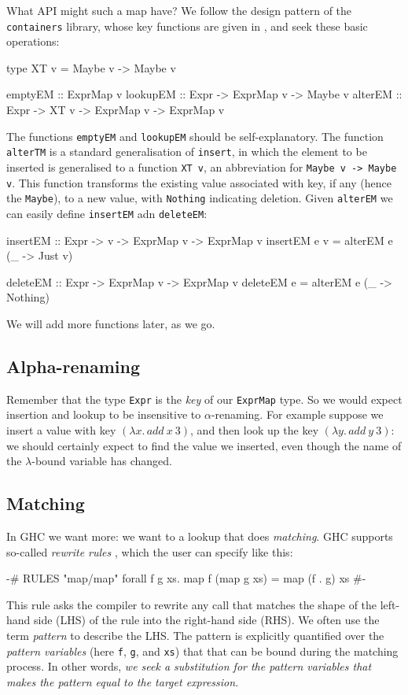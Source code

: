 \documentclass[acmsmall]{acmart}
\theoremstyle{theorem}
\theoremstyle{definition}
\theoremstyle{remark}
\begin{document}
What API might such a map have? We follow the design pattern of
the \lstinline{containers} library, whose key functions are given in ,
and seek these basic operations:
\begin{code}
  type XT v = Maybe v -> Maybe v

  emptyEM  :: ExprMap v
  lookupEM :: Expr -> ExprMap v -> Maybe v
  alterEM  :: Expr -> XT v -> ExprMap v -> ExprMap v
\end{code}
The functions \lstinline{emptyEM} and \lstinline{lookupEM} should be
self-explanatory.  The function \lstinline{alterTM} is a standard
generalisation of \lstinline{insert}, in which the element to be
inserted is generalised to a function \lstinline{XT v}, an
abbreviation for \lstinline{Maybe v -> Maybe v}.  This function
transforms the existing value associated with key, if any (hence the
\lstinline{Maybe}), to a new value, with \lstinline{Nothing}
indicating deletion.  Given \lstinline{alterEM} we can easily define \lstinline{insertEM} adn \lstinline{deleteEM}:
\begin{code}
  insertEM :: Expr -> v -> ExprMap v -> ExprMap v
  insertEM e v = alterEM e (\_ -> Just v)

  deleteEM :: Expr -> ExprMap v -> ExprMap v
  deleteEM e = alterEM e (\_ -> Nothing)
\end{code}
We will add more functions later, as we go.

\subsection{Alpha-renaming}

Remember that the type \lstinline{Expr} is the \emph{key} of our \lstinline{ExprMap} type.
So we would expect insertion and lookup to be insensitive to
$\alpha$-renaming. For example suppose we insert a value with key
$(\lambda x.\, add~ x~ 3)$, and then look up the
key $(\lambda y.\, add~ y~ 3)$: we should
certainly expect to find the value we inserted, even though the name
of the $\lambda$-bound variable has changed.


\subsection{Matching} \label{sec:matching-intro}

In GHC we want more: we want to a lookup that does \emph{matching}.  GHC supports
so-called \emph{rewrite rules} \cite{rewrite-rule-paper}, which the user can specify like this:
\begin{code}
{-# RULES "map/map" forall f g xs. map f (map g xs) = map (f . g) xs #-}
\end{code}
This rule asks the compiler to rewrite any call that matches the shape
of the left-hand side (LHS) of the rule into the right-hand side
(RHS).  We often use the term \emph{pattern} to describe the LHS.
The pattern is explicitly quantified over the \emph{pattern variables}
(here \lstinline{f}, \lstinline{g}, and \lstinline{xs}) that
that can be bound during the matching process.  In other words, \emph{we seek a substitution
for the pattern variables that makes the pattern equal to the target expression}.
\end{document}
